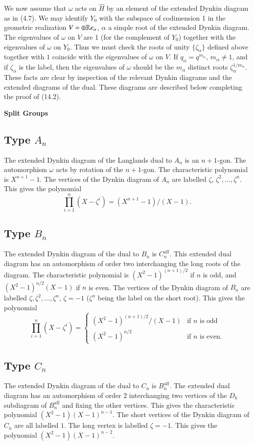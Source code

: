 \documentclass{amsart}
\def\Re{{\Bbb R}}                          %
\def\what#1{\widehat#1}
\def\aff{\operatorname{aff}}
\begin{document}
We now assume that $\omega$ acts on $\what H$ by an
element of the extended Dynkin diagram as in (4.7).
We may identify $Y_0$ with
the subspace of codimension 1 in the geometric
realization $V=\oplus\Re e_\alpha$, $\alpha$
a simple root of the extended Dynkin diagram.  The
eigenvalues of $\omega$ on $V$ are 1 (for the complement
of $Y_0$) together with the eigenvalues of 
$\omega$ on $Y_0$.
Thus we must check the roots of unity $\{\zeta_\alpha\}$ defined above
together with $1$ coincide with the eigenvalues
of $\omega$ on $V$.
If $q_\alpha=q^{m_\alpha}$, 
$m_\alpha\ne 1$, and if $\zeta_\alpha$ is the label, then
the eigenvalues of $\omega$ should be
the $m_\alpha$ distinct roots $\zeta_\alpha^{1/m_\alpha}$.
These facts are clear by inspection of the relevant Dynkin
diagrams and the extended diagrams of the dual.  These diagrams are
described below completing
the proof of (14.2).
\bigskip

\centerline{\bf Split Groups}
\bigskip

\subsection{Type $A_n$}
The extended Dynkin diagram of the Langlands dual to $A_n$ is an
$n+1$-gon.  The automorphism $\omega$ acts by rotation of the $n+1$-gon.
The characteristic polynomial is $X^{n+1}-1$.  The vertices of the
Dynkin diagram of $A_n$ are labelled $\zeta$, $\zeta^2,\ldots,\zeta^n$.
This gives the polynomial $$\prod_{i=1}^n(X-\zeta^i) = (X^{n+1}-1)/(X-1).$$

\subsection{Type $B_n$}
The extended Dynkin diagram of the dual to $B_n$ is $C_n^{\aff}$.  This extended
dual
diagram has an automorphism of order two interchanging the long roots
of the diagram.  The characteristic polynomial is $(X^2-1)^{(n+1)/2}$ if
$n$ is odd, and $(X^2-1)^{n/2}(X-1)$ if $n$ is even.  The vertices
of the Dynkin diagram of $B_n$ are labelled $\zeta,\zeta^2,\ldots,\zeta^n$,
$\zeta=-1$ ($\zeta^n$ being the label on the short root).  This gives
the polynomial
$$\prod_{i=1}^n (X-\zeta^i) = \begin{cases} (X^2-1)^{(n+1)/2}/(X-1) & \text{if $n$ is odd}\\
				(X^2-1)^{n/2}& \text{if $n$ is even.}\end{cases}
$$
\subsection{Type $C_n$}
The extended Dynkin diagram of the dual to $C_n$ is $B_n^{\aff}$.  The
extended dual
diagram has an automorphism of order 2 interchanging two vertices
of the $D_k$ subdiagram of $B_n^{\aff}$ and fixing the other vertices.
This gives the characteristic polynomial $(X^2-1)(X-1)^{n-1}$.
The short vertices of the Dynkin diagram of $C_n$ are all labelled $1$.
The long vertex is labelled $\zeta=-1$.  This gives the polynomial
$(X^2-1)(X-1)^{n-2}$.
\end{document}
